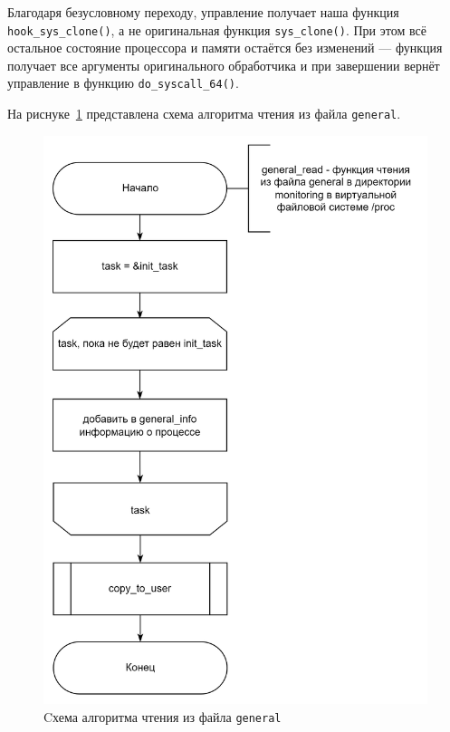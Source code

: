 Благодаря безусловному переходу, управление получает наша функция \texttt{hook\_sys\_clone()}, а не
оригинальная функция \texttt{sys\_clone()}. При этом всё остальное состояние процессора и памяти остаётся без изменений --- функция получает
все аргументы оригинального обработчика и при завершении вернёт
управление в функцию \texttt{do\_syscall\_64()}.

На риснуке~\ref{img:alg:general} представлена схема алгоритма чтения из файла \texttt{general}.

\begin{figure}[h]
	\centering
	\includegraphics[height=0.6\textheight]{img/alg-general.png}
	\caption{Cхема алгоритма чтения из файла \texttt{general}}
	\label{img:alg:general}
\end{figure}

